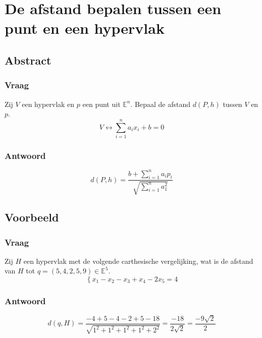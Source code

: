 \documentclass[main.tex]{subfiles}
\begin{document}
\newpage
\section{De afstand bepalen tussen een punt en een hypervlak }
\subsection*{Abstract}
\subsubsection*{Vraag}
\begin{center}
  Zij $V$ een hypervlak en $p$ een punt uit $\mathbb{E}^{n}$.
  Bepaal de afstand $d(P,h)$ tussen $V$ en $p$.
  \[ V \leftrightarrow   \sum_{i=1}^{n}a_{i}x_{i} + b = 0 \]
\end{center}
\subsubsection*{Antwoord}
\[d(P,h) = \frac{b+ \sum_{i=1}^{n}a_{i}p_{i}}{\sqrt{\sum_{i=1}^{n}a_{1}^{2}}}\]

\subsection*{Voorbeeld}
\subsubsection*{Vraag}
\begin{center}
  Zij $H$ een hypervlak met de volgende carthesische vergelijking, wat is de afstand van $H$ tot $q=(5,4,2,5,9) \in \mathbb{E}^{5}$.
  \[ \left\{ x_{1}-x_{2}-x_{3}+x_{4}-2x_{5} = 4  \right. \]
\end{center}
\subsubsection*{Antwoord}
\[ d(q,H) = \frac{-4 + 5-4-2+5-18}{\sqrt{1^{2}+1^{2}+1^{2}+1^{2}+2^{2}}} = \frac{-18}{2\sqrt{2}} = \frac{-9\sqrt{2}}{2}\]
\end{document}
